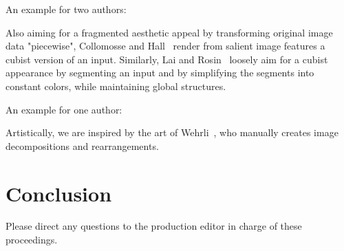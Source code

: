 An example for two authors:

Also aiming for a fragmented aesthetic appeal by transforming original image data "piecewise", Collomosse and Hall~\cite{collomosse_2003_csr} render from salient image features a cubist version of an input. Similarly, Lai and Rosin~\cite{lai_2013_are} loosely aim for a cubist appearance by segmenting an input and by simplifying the segments into constant colors, while maintaining global structures.

An example for one author:

Artistically, we are inspired by the art of Wehrli~\cite{wehrli_2003_tau}, who manually creates image decompositions and rearrangements.

\section{Conclusion}

Please direct any questions to the production editor in charge of
these proceedings.



%








